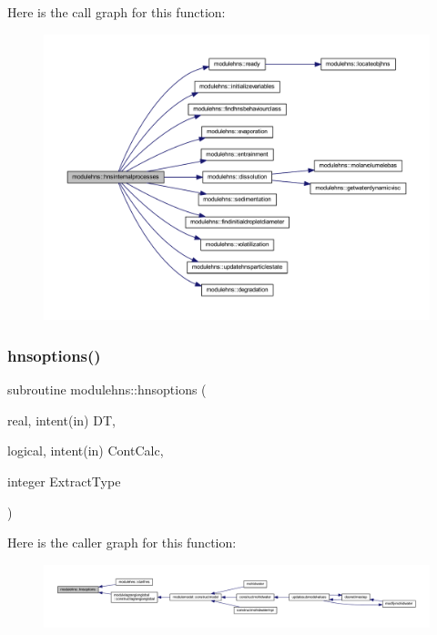 Here is the call graph for this function\+:\nopagebreak
\begin{figure}[H]
\begin{center}
\leavevmode
\includegraphics[width=350pt]{namespacemodulehns_a6329952c484c367d1190fff3d5a0d951_cgraph}
\end{center}
\end{figure}
\mbox{\label{namespacemodulehns_a71301e39dc6614233febb77b7cd18194}} 
\subsubsection{\texorpdfstring{hnsoptions()}{hnsoptions()}}
{\footnotesize\ttfamily subroutine modulehns\+::hnsoptions (\begin{DoxyParamCaption}\item[{real, intent(in)}]{DT,  }\item[{logical, intent(in)}]{Cont\+Calc,  }\item[{integer}]{Extract\+Type }\end{DoxyParamCaption})\hspace{0.3cm}{\ttfamily [private]}}

Here is the caller graph for this function\+:\nopagebreak
\begin{figure}[H]
\begin{center}
\leavevmode
\includegraphics[width=350pt]{namespacemodulehns_a71301e39dc6614233febb77b7cd18194_icgraph}
\end{center}
\end{figure}
\mbox{\label{namespacemodulehns_a23256714b2ab17223f430aced19cdda8}} 
